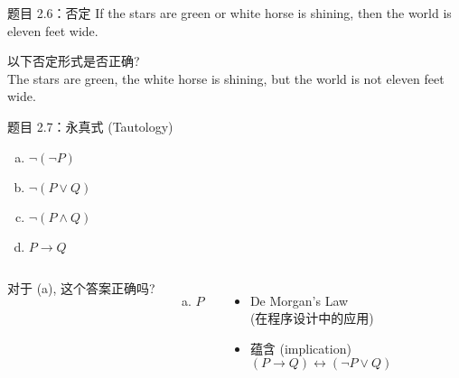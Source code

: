 \begin{frame}{}
  \begin{exampleblock}{题目 2.6：否定}
    If the stars are green or white horse is shining,
    then the world is eleven feet wide.
  \end{exampleblock}

  \vspace{0.50cm}

  以下否定形式是否正确?\\[8pt]

  The stars are green, the white horse is shining, but the world is not eleven feet wide.
\end{frame}

\begin{frame}{}
  \begin{exampleblock}{题目 2.7：永真式 (Tautology)}
    \begin{enumerate}[(a)]
      \item $\lnot(\lnot P)$
      \item $\lnot(P \lor Q)$
      \item $\lnot(P \land Q)$
      \item $P \to Q$
    \end{enumerate}
  \end{exampleblock}

  \vspace{0.30cm}
  \begin{columns}
      对于 (a), 这个答案正确吗?
      \begin{enumerate}[(a)]
	\item $P$
      \end{enumerate}
    \pause
      \begin{itemize}
	\item De Morgan's Law \\
	  (在程序设计中的应用)
	\item 蕴含 (implication)
	  \[
	    (P \to Q) \leftrightarrow (\lnot P \lor Q)
	  \]
      \end{itemize}
  \end{columns}

\end{frame}

